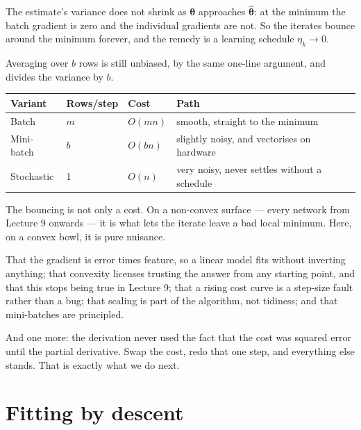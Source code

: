 \documentclass[11pt,a4paper]{article}
\begin{document}
\begin{failbox}[title={Failure condition --- unbiased is not the same as right}]
The estimate's variance does not shrink as $\boldsymbol\theta$ approaches
$\hat{\boldsymbol\theta}$: at the minimum the batch gradient is zero and the
individual gradients are not. So the iterates bounce around the minimum
forever, and the remedy is a learning schedule $\eta_k \to 0$.

Averaging over $b$ rows is still unbiased, by the same one-line argument, and
divides the variance by $b$.
\end{failbox}

\begin{center}
\small
\begin{tabular}{lllp{}}
\toprule
\textbf{Variant} & \textbf{Rows/step} & \textbf{Cost} & \textbf{Path} \\
\midrule
Batch      & $m$ & $O(mn)$ & smooth, straight to the minimum \\
Mini-batch & $b$ & $O(bn)$ & slightly noisy, and vectorises on hardware \\
Stochastic & 1   & $O(n)$  & very noisy, never settles without a schedule \\
\bottomrule
\end{tabular}
\end{center}

The bouncing is not only a cost. On a non-convex surface --- every network from
Lecture 9 onwards --- it is what lets the iterate leave a bad local minimum.
Here, on a convex bowl, it is pure nuisance.

\begin{keybox}[title={What the derivation buys you}]
That the gradient is error times feature, so a linear model fits without
inverting anything; that convexity licenses trusting the answer from any
starting point, and that this stops being true in Lecture 9; that a rising cost
curve is a step-size fault rather than a bug; that scaling is part of the
algorithm, not tidiness; and that mini-batches are principled.

And one more: the derivation never used the fact that the cost was squared
error until the partial derivative. Swap the cost, redo that one step, and
everything else stands. That is exactly what we do next.
\end{keybox}

\section{Fitting by descent}
\end{document}
